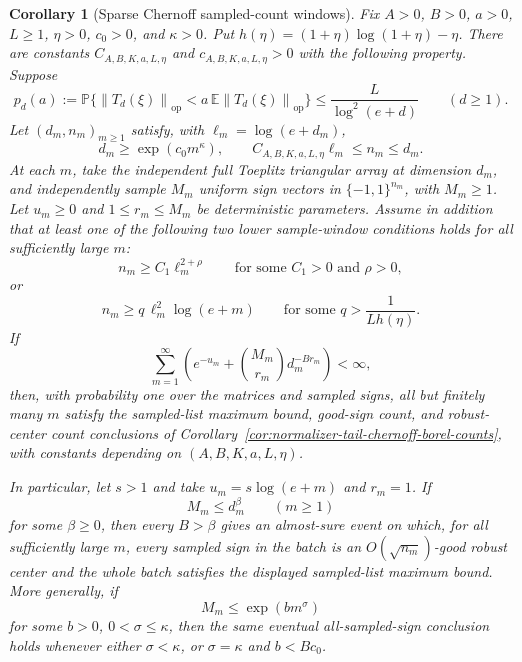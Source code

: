 \documentclass[11pt]{amsart}
\numberwithin{equation}{section}
\newtheorem{corollary}[theorem]{Corollary}
\theoremstyle{definition}
\theoremstyle{remark}
\newcommand{\op}{\mathrm{op}}
\newcommand{\Prob}{\mathbb P}
\newcommand{\Exp}{\mathbb E}
\newcommand{\norm}[1]{\left\lVert #1\right\rVert}
\begin{document}
\begin{corollary}[Sparse Chernoff sampled-count windows]
\label{cor:normalizer-tail-chernoff-borel-window-counts}
Fix \(A>0\), \(B>0\), \(a>0\), \(L\ge1\), \(\eta>0\), \(c_0>0\), and
\(\kappa>0\).  Put \(h(\eta)=(1+\eta)\log(1+\eta)-\eta\).  There are constants
\(C_{A,B,K,a,L,\eta}\) and \(c_{A,B,K,a,L,\eta}>0\) with the following
property.  Suppose
\[
  p_d(a):=\Prob\{\norm{T_d(\xi)}_{\op}
      <a\,\Exp\norm{T_d(\xi)}_{\op}\}
  \le \frac{L}{\log^2(e+d)}
  \qquad(d\ge1).
\]
Let \((d_m,n_m)_{m\ge1}\) satisfy, with \(\ell_m=\log(e+d_m)\),
\[
  d_m\ge \exp(c_0m^\kappa),\qquad
  C_{A,B,K,a,L,\eta}\ell_m\le n_m\le d_m .
\]
At each \(m\), take the independent full Toeplitz triangular array at dimension
\(d_m\), and independently sample \(M_m\) uniform sign vectors in
\(\{-1,1\}^{n_m}\), with \(M_m\ge1\).  Let \(u_m\ge0\) and
\(1\le r_m\le M_m\) be deterministic parameters.  Assume in addition that at
least one of the following two lower sample-window conditions holds for all
sufficiently large \(m\):
\[
  n_m\ge C_1\ell_m^{2+\rho}
  \qquad\text{for some } C_1>0 \text{ and } \rho>0,
\]
or
\[
  n_m\ge q\,\ell_m^2\log(e+m)
  \qquad\text{for some } q>\frac1{Lh(\eta)} .
\]
If
\[
  \sum_{m=1}^\infty
  \left(e^{-u_m}+\binom{M_m}{r_m}d_m^{-B r_m}\right)<\infty,
\]
then, with probability one over the matrices and sampled signs, all but
finitely many \(m\) satisfy the sampled-list maximum bound, good-sign count, and
robust-center count conclusions of
Corollary~\ref{cor:normalizer-tail-chernoff-borel-counts}, with constants
depending on \((A,B,K,a,L,\eta)\).

In particular, let \(s>1\) and take \(u_m=s\log(e+m)\) and \(r_m=1\).  If
\[
  M_m\le d_m^\beta
  \qquad(m\ge1)
\]
for some \(\beta\ge0\), then every \(B>\beta\) gives an almost-sure event on
which, for all sufficiently large \(m\), every sampled sign in the batch is an
\(O(\sqrt{n_m})\)-good robust center and the whole batch satisfies the displayed
sampled-list maximum bound.  More generally, if
\[
  M_m\le \exp(bm^\sigma)
\]
for some \(b>0\), \(0<\sigma\le\kappa\), then the same eventual all-sampled-sign
conclusion holds whenever either \(\sigma<\kappa\), or \(\sigma=\kappa\) and
\(b<Bc_0\).
\end{corollary}
\end{document}
